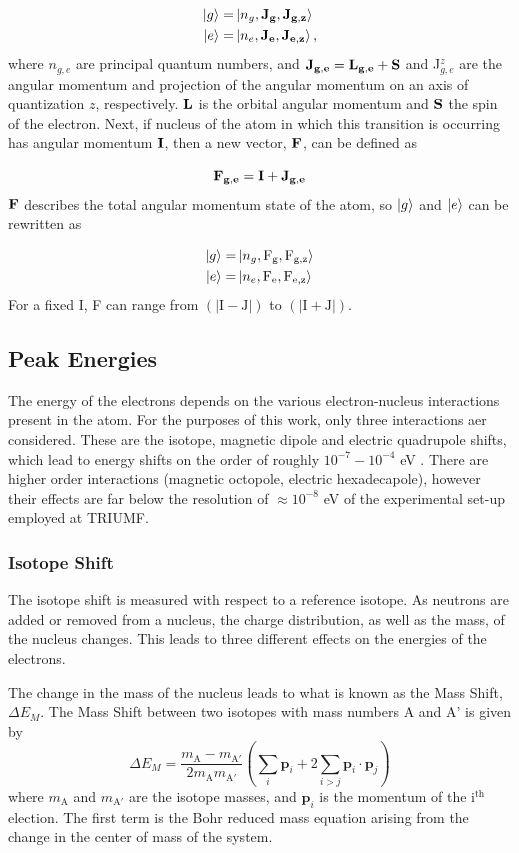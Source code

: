 \begin{align}
\ket{g} =& \ket{n_g,\mathrm{\bf{J}_g,J_{g,z}}}\\
\ket{e} =& \ket{n_e,\mathrm{\bf{J}_e,J_{e,z}}},
\end{align}
where $n_{g,e}$ are principal quantum numbers, and $\bf{J}_{g,e}=\bf{L}_{g,e}+S$ and J$_{g,e}^z$ are the angular momentum and projection of the angular momentum on an axis of quantization $z$, respectively. $\bf{L}$ is the orbital angular momentum and $\bf{S}$ the spin of the electron. Next, if nucleus of the atom in which this transition is occurring has angular momentum $\bf{I}$, then a new vector, $\bf{F}$, can be defined as 

\begin{equation}
\bf{F_{g,e}} = \bf{I} + \bf{J}_{g,e}
\end{equation}
$\bf{F}$ describes the total angular momentum state of the atom, so $\ket{g}$ and $\ket{e}$ can be rewritten as

\begin{align}
\ket{g} =& \ket{n_g,\mathrm{F_g, F_{g,z}}}\\
\ket{e} =& \ket{n_e,\mathrm{F_e, F_{e,z}}}
\end{align}
For a fixed I, F can range from $(|\mathrm{I-J}|)$ to $(|\mathrm{I+J}|)$.
\subsection{Peak Energies}
The energy of the electrons depends on the various electron-nucleus interactions present in the atom. For the purposes of this work, only three interactions aer considered. These are the isotope, magnetic dipole and electric quadrupole shifts, which lead to energy shifts on the order of roughly $10^{-7}-10^{-4}$ eV \cite{ModAN}. There are higher order interactions (magnetic octopole, electric hexadecapole), however their effects are far below the resolution of $\approx 10^{-8}$ eV of the experimental set-up employed at TRIUMF\cite{GA69}.

\subsubsection{Isotope Shift}
The isotope shift is measured with respect to a reference isotope. As neutrons are added or removed from a nucleus, the charge distribution, as well as the mass, of the nucleus changes. This leads to three different effects on the energies of the electrons. 

The change in the mass of the nucleus leads to what is known as the Mass Shift, $\Delta E_M$. The Mass Shift between two isotopes with mass numbers A and A' is given by \citep{TomT}
\begin{equation}
\Delta E_M = \frac{m_{\mathrm{A}}-m_{\mathrm{A'}}}{2 m_{\mathrm{A}} m_{\mathrm{A'}}} \left(\sum_i\mathrm{\textbf{p}}_i +2 \sum_{i>j}\mathrm{\textbf{p}}_i \cdot \mathrm{\textbf{p}}_j \right)
\end{equation}
where $m_{\mathrm{A}}$ and $m_{\mathrm{A'}}$ are the isotope masses, and $\textbf{p}_i$ is the momentum of the i$^{\mathrm{th}}$ election. The first term is the Bohr reduced mass equation arising from the change in the center of mass of the system.

